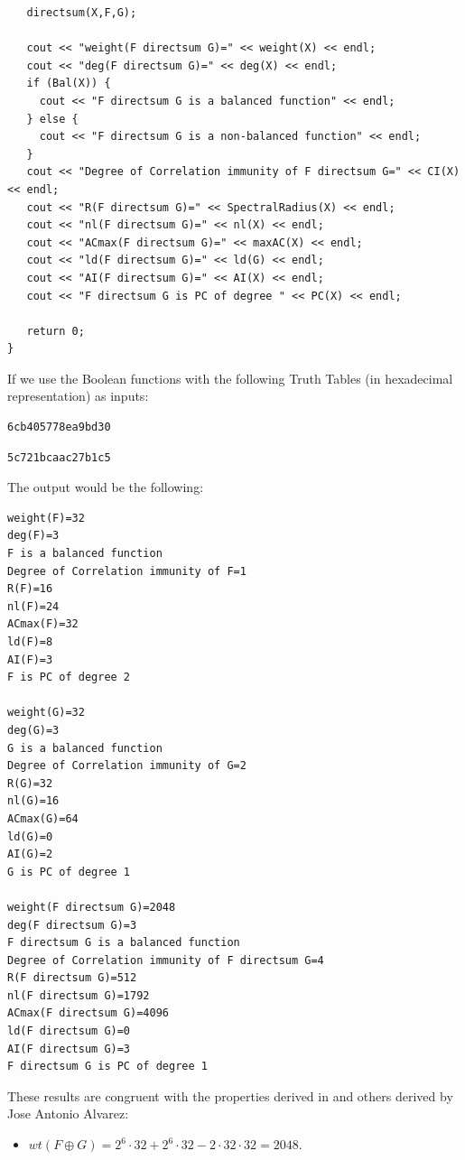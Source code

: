 \begin{example}
\begin{verbatim}
   directsum(X,F,G);

   cout << "weight(F directsum G)=" << weight(X) << endl;
   cout << "deg(F directsum G)=" << deg(X) << endl;
   if (Bal(X)) {
     cout << "F directsum G is a balanced function" << endl;
   } else {
     cout << "F directsum G is a non-balanced function" << endl;
   }
   cout << "Degree of Correlation immunity of F directsum G=" << CI(X) << endl;
   cout << "R(F directsum G)=" << SpectralRadius(X) << endl;
   cout << "nl(F directsum G)=" << nl(X) << endl;
   cout << "ACmax(F directsum G)=" << maxAC(X) << endl;
   cout << "ld(F directsum G)=" << ld(G) << endl;
   cout << "AI(F directsum G)=" << AI(X) << endl;
   cout << "F directsum G is PC of degree " << PC(X) << endl;

   return 0;
}
\end{verbatim}

If we use the Boolean functions with the following Truth Tables (in hexadecimal representation) as inputs:

\begin{verbatim}
6cb405778ea9bd30
\end{verbatim}

\begin{verbatim}
5c721bcaac27b1c5
\end{verbatim}

The output would be the following:

\begin{verbatim}
weight(F)=32
deg(F)=3
F is a balanced function
Degree of Correlation immunity of F=1
R(F)=16
nl(F)=24
ACmax(F)=32
ld(F)=8
AI(F)=3
F is PC of degree 2

weight(G)=32
deg(G)=3
G is a balanced function
Degree of Correlation immunity of G=2
R(G)=32
nl(G)=16
ACmax(G)=64
ld(G)=0
AI(G)=2
G is PC of degree 1

weight(F directsum G)=2048
deg(F directsum G)=3
F directsum G is a balanced function
Degree of Correlation immunity of F directsum G=4
R(F directsum G)=512
nl(F directsum G)=1792
ACmax(F directsum G)=4096
ld(F directsum G)=0
AI(F directsum G)=3
F directsum G is PC of degree 1
\end{verbatim}

These results are congruent with the properties derived in \cite{SarkarMaitra:00} and others derived by Jose Antonio Alvarez:

\begin{itemize}
\item $wt(F \oplus G) = 2^6 \cdot 32+2^6 \cdot 32 - 2 \cdot 32 \cdot 32 = 2048$.


\end{itemize}
\end{example}
